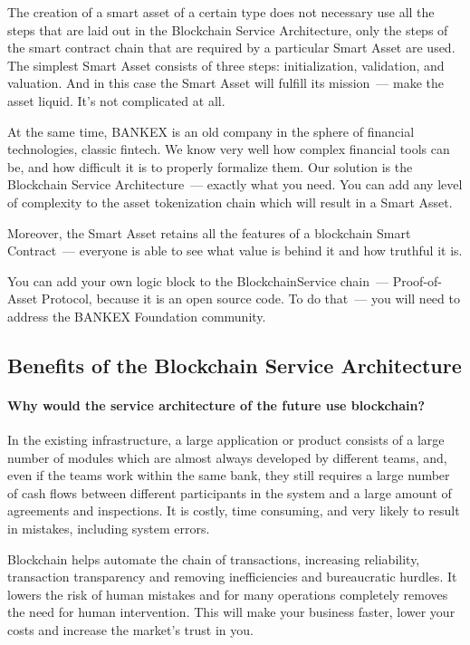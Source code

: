 \documentclass{article}
\begin{document}
\begin{multicols}{2}
The creation of a smart asset of a certain type does not necessary use all the steps that are laid out in the Blockchain Service Architecture, only the steps of the smart contract chain that are required by a particular Smart Asset are used. The simplest Smart Asset consists of three steps: initialization, validation, and valuation. And in this case the Smart Asset will fulfill its mission~--- make the asset liquid. It’s not complicated at all. 

At the same time, BANKEX is an old company in the sphere of financial technologies, classic fintech. We know very well how complex financial tools can be, and how difficult it is to properly formalize them. Our solution is the Blockchain Service Architecture~--- exactly what you need. You can add any level of complexity to the asset tokenization chain which will result in a Smart Asset.

Moreover, the Smart Asset retains all the features of a blockchain Smart Contract~--- everyone is able to see what value is behind it and how truthful it is. 

You can add your own logic block to the BlockchainService chain~--- Proof-of-Asset Protocol, because it is an open source code. To do that~--- you will need to address the BANKEX Foundation community.

\subsection{Benefits of the Blockchain Service Architecture}

\paragraph*{Why would the service architecture of the future use blockchain?} In the existing infrastructure, a large application or product consists of a large number of modules which are almost always developed by different teams, and, even if the teams work within the same bank, they still requires a large number of cash flows between different participants in the system and a large amount of agreements and inspections. It is costly, time consuming, and very likely to result in mistakes, including system errors.

Blockchain helps automate the chain of transactions, increasing reliability, transaction transparency and removing inefficiencies and bureaucratic hurdles. It lowers the risk of human mistakes and for many operations completely removes the need for human intervention. This will make your business faster, lower your costs and increase the market's trust in you.


\end{multicols}
\end{document}
